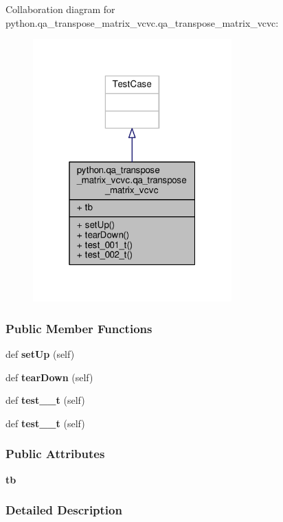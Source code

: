Collaboration diagram for python.\+qa\+\_\+transpose\+\_\+matrix\+\_\+vcvc.\+qa\+\_\+transpose\+\_\+matrix\+\_\+vcvc\+:
\nopagebreak
\begin{figure}[H]
\begin{center}
\leavevmode
\includegraphics[width=217pt]{d1/d25/classpython_1_1qa__transpose__matrix__vcvc_1_1qa__transpose__matrix__vcvc__coll__graph}
\end{center}
\end{figure}
\subsubsection*{Public Member Functions}
\begin{DoxyCompactItemize}
\item 
def {\bf set\+Up} (self)
\item 
def {\bf tear\+Down} (self)
\item 
def {\bf test\+\_\+\_\+t} (self)
\item 
def {\bf test\+\_\+\_\+t} (self)
\end{DoxyCompactItemize}
\subsubsection*{Public Attributes}
\begin{DoxyCompactItemize}
\item 
{\bf tb}
\end{DoxyCompactItemize}


\subsubsection{Detailed Description}


